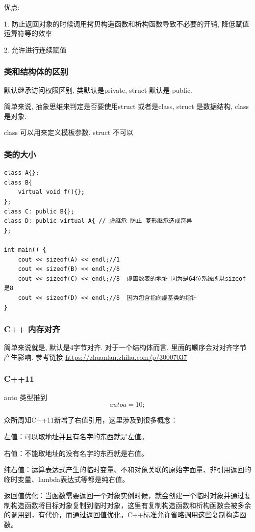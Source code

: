 优点:

1. 防止返回对象的时候调用拷贝构造函数和析构函数导致不必要的开销, 降低赋值运算符等的效率

2. 允许进行连续赋值

\subsubsection{类和结构体的区别}

默认继承访问权限区别, 类默认是private, struct 默认是 public.

简单来说, 抽象思维来判定是否要使用struct 或者是class, struct 是数据结构, class 是对象.

class 可以用来定义模板参数, struct 不可以

\subsubsection{类的大小}

\begin{lstlisting}
class A{};
class B{
	virtual void f(){};
};
class C: public B{};
class D: public virtual A{ // 虚继承 防止 菱形继承造成奇异
};

int main() {
	cout << sizeof(A) << endl;//1
	cout << sizeof(B) << endl;//8
	cout << sizeof(C) << endl;//8  虚函数表的地址 因为是64位系统所以sizeof是8
	cout << sizeof(D) << endl;//8  因为包含指向虚基类的指针
}
\end{lstlisting}


\subsubsection{C++ 内存对齐}
简单来说就是, 默认是4字节对齐. 对于一个结构体而言, 里面的顺序会对对齐字节产生影响. 参考链接
\url{https://zhuanlan.zhihu.com/p/30007037}

\subsubsection{C++11}
auto 类型推到
$$
	auto a = 10;
$$

众所周知C++11新增了右值引用，这里涉及到很多概念：

左值：可以取地址并且有名字的东西就是左值。

右值：不能取地址的没有名字的东西就是右值。

纯右值：运算表达式产生的临时变量、不和对象关联的原始字面量、非引用返回的临时变量、lambda表达式等都是纯右值。

返回值优化：当函数需要返回一个对象实例时候，就会创建一个临时对象并通过复制构造函数将目标对象复制到临时对象，这里有复制构造函数和析构函数会被多余的调用到，有代价，而通过返回值优化，C++标准允许省略调用这些复制构造函数。

